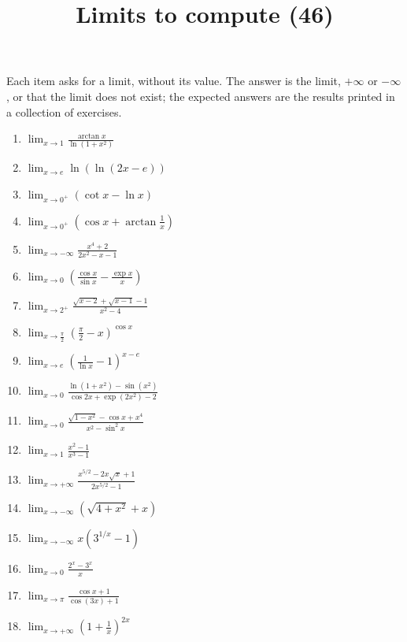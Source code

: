 \documentclass[11pt,a4paper]{article}
\title{Limits to compute (46)}
\author{}
\date{}
\begin{document}
\maketitle
Each item asks for a limit, without its value. The answer is the limit, $+\infty$ or $-\infty$, or that the limit does not exist; the expected answers are the results printed in a collection of exercises.

\begin{enumerate}
\item $\displaystyle \lim_{x \to 1} \frac{\arctan x}{\ln(1 + x^{2})}$
\item $\displaystyle \lim_{x \to e} \ln\left(\ln(2x - e)\right)$
\item $\displaystyle \lim_{x \to 0^{+}} (\cot x - \ln x)$
\item $\displaystyle \lim_{x \to 0^{+}} \left(\cos x + \arctan\frac{1}{x}\right)$
\item $\displaystyle \lim_{x \to -\infty} \frac{x^{4} + 2}{2x^{2} - x - 1}$
\item $\displaystyle \lim_{x \to 0} \left(\frac{\cos x}{\sin x} - \frac{\exp x}{x}\right)$
\item $\displaystyle \lim_{x \to 2^{+}} \frac{\sqrt{x - 2} + \sqrt{x - 1} - 1}{x^{2} - 4}$
\item $\displaystyle \lim_{x \to \frac{\pi}{2}} \left(\frac{\pi}{2} - x\right)^{\cos x}$
\item $\displaystyle \lim_{x \to e} \left(\frac{1}{\ln x} - 1\right)^{x - e}$
\item $\displaystyle \lim_{x \to 0} \frac{\ln(1 + x^{2}) - \sin(x^{2})}{\cos 2x + \exp(2x^{2}) - 2}$
\item $\displaystyle \lim_{x \to 0} \frac{\sqrt{1 - x^{2}} - \cos x + x^{4}}{x^{2} - \sin^{2} x}$
\item $\displaystyle \lim_{x \to 1} \frac{x^{2} - 1}{x^{3} - 1}$
\item $\displaystyle \lim_{x \to +\infty} \frac{x^{5/2} - 2x\sqrt{x} + 1}{2x^{5/2} - 1}$
\item $\displaystyle \lim_{x \to -\infty} \left(\sqrt{4 + x^{2}} + x\right)$
\item $\displaystyle \lim_{x \to -\infty} x\left(3^{1/x} - 1\right)$
\item $\displaystyle \lim_{x \to 0} \frac{2^{x} - 3^{x}}{x}$
\item $\displaystyle \lim_{x \to \pi} \frac{\cos x + 1}{\cos(3x) + 1}$
\item $\displaystyle \lim_{x \to +\infty} \left(1 + \frac{1}{x}\right)^{2x}$

\end{enumerate}
\end{document}
